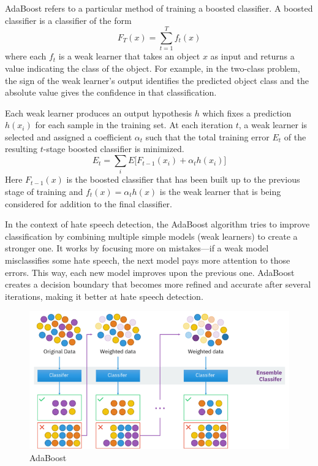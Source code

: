 AdaBoost refers to a particular method of training a boosted classifier. A boosted classifier is a classifier of the form
\begin{equation}
F_T(x) = \sum_{t=1}^{T} f_t(x)
\end{equation}
where each \( f_t \) is a weak learner that takes an object \( x \) as input and returns a value indicating the class of the object. For example, in the two-class problem, the sign of the weak learner's output identifies the predicted object class and the absolute value gives the confidence in that classification.

Each weak learner produces an output hypothesis \( h \) which fixes a prediction \( h(x_i) \) for each sample in the training set. At each iteration \( t \), a weak learner is selected and assigned a coefficient \( \alpha_t \) such that the total training error \( E_t \) of the resulting \( t \)-stage boosted classifier is minimized.
\begin{equation}
E_t = \sum_{i} E \big[ F_{t-1}(x_i) + \alpha_t h(x_i) \big]
\end{equation}
Here \( F_{t-1}(x) \) is the boosted classifier that has been built up to the previous stage of training and 
\( f_t(x) = \alpha_t h(x) \) is the weak learner that is being considered for addition to the final classifier.

In the context of hate speech detection, the AdaBoost algorithm tries to improve classification by combining multiple simple models (weak learners) to create a stronger one. It works by focusing more on mistakes—if a weak model misclassifies some hate speech, the next model pays more attention to those errors. This way, each new model improves upon the previous one. AdaBoost creates a decision boundary that becomes more refined and accurate after several iterations, making it better at hate speech detection.
\begin{figure}
\centering
\includegraphics[scale=0.5]{images/adaboost.png}
\caption{AdaBoost}
\end{figure}

